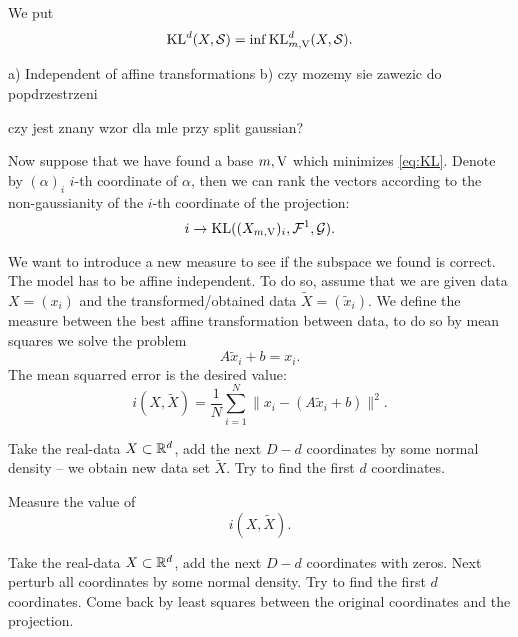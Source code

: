 We put
$$
\mathrm{KL}^d(X,\mathcal{S})=\inf \mathrm{KL}^d_{m,\mathrm{V}}(X,\mathcal{S}).
$$

\begin{theorem}
a) Independent of affine transformations b) czy mozemy sie zawezic do popdrzestrzeni
\end{theorem}

\begin{problem}
czy jest znany wzor dla mle przy split gaussian?
\end{problem}

\begin{theorem}

\end{theorem}

Now suppose that we have found a base $m,\mathrm{V}$ which minimizes \eqref{eq:KL}.
Denote by $(\alpha)_i$
$i$-th coordinate of $\alpha$, then we can rank the vectors according to the non-gaussianity of the $i$-th coordinate of the projection:
$$
i \to \mathrm{KL}((X_{m,\mathrm{V}})_i,\mathcal{F}^1,\mathcal{G}).
$$
 
We want to introduce a new measure to see if the subspace we found is correct.
The model has to be affine independent. To do so, assume that we are given
data $X=(x_i)$ and the transformed/obtained data $\tilde X=(\tilde x_i)$.
We define the measure between the best affine transformation between data, to do 
so by mean squares we solve the problem
$$
A\tilde x_i+b=x_i.
$$
The mean squarred error is the desired value:
$$
i(X,\tilde X)=\frac{1}{N}\sum_{i=1}^N \|x_i-(A\tilde x_i+b)\|^2.
$$
 
\begin{example}
Take the real-data $X \subset \mathbb{R}^d$, add the next $D-d$ coordinates by some normal density -- we obtain new data set $\tilde X$. Try to find the first $d$ coordinates. 

Measure the value of
$$
i(X,\tilde X).
$$
\end{example}
 
\begin{example}
Take the real-data $X \subset \mathbb{R}^d$, add the next $D-d$ coordinates with zeros.
Next perturb all coordinates by some normal density. Try to find the first $d$ coordinates. Come back by least squares between the original coordinates and the projection.
\end{example}